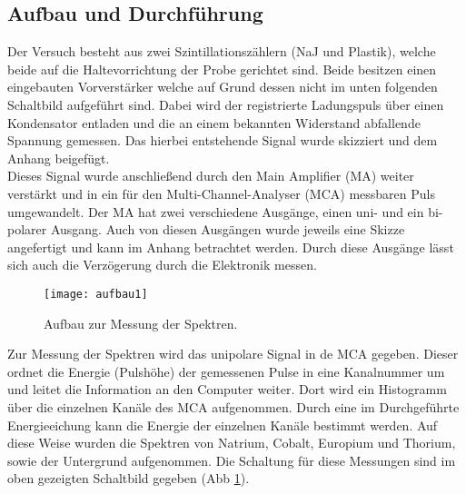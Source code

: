 \subsection{Aufbau und Durchführung}
Der Versuch besteht aus zwei Szintillationszählern (NaJ und Plastik), welche beide auf die Haltevorrichtung der Probe gerichtet sind. Beide besitzen einen eingebauten Vorverstärker welche auf Grund dessen nicht im unten folgenden Schaltbild aufgeführt sind. Dabei wird der registrierte Ladungspuls über einen Kondensator entladen und die an einem bekannten Widerstand abfallende Spannung gemessen. Das hierbei entstehende Signal wurde skizziert und dem Anhang beigefügt.\\
Dieses Signal wurde anschließend durch den Main Amplifier (MA) weiter verstärkt und in ein für den Multi-Channel-Analyser (MCA) messbaren Puls umgewandelt. Der MA hat zwei verschiedene Ausgänge, einen uni- und ein bi-polarer Ausgang. Auch von diesen Ausgängen wurde jeweils eine Skizze angefertigt und kann im Anhang betrachtet werden. Durch diese Ausgänge lässt sich auch die Verzögerung durch die Elektronik messen.\\
\begin{figure}[h]
\begin{center}
\texttt{[image: aufbau1]}
\caption{Aufbau zur Messung der Spektren.}
\label{fig:aufbau1}
\end{center}
\end{figure}
Zur Messung der Spektren wird das unipolare Signal in de MCA gegeben. Dieser ordnet die Energie (Pulshöhe) der gemessenen Pulse in eine Kanalnummer um und leitet die Information an den Computer weiter. Dort wird ein Histogramm über die einzelnen Kanäle des MCA aufgenommen. Durch eine im Durchgeführte Energieeichung kann die Energie der einzelnen Kanäle bestimmt werden. Auf diese Weise wurden die Spektren von Natrium, Cobalt, Europium und Thorium, sowie der Untergrund aufgenommen. Die Schaltung für diese Messungen sind im oben gezeigten Schaltbild gegeben (Abb \ref{fig:aufbau1}).
